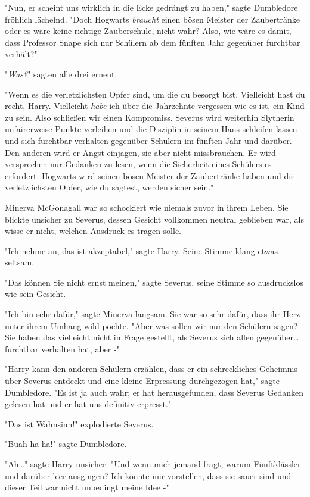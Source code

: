 {"Nun, er scheint uns wirklich in die Ecke gedrängt zu haben," sagte Dumbledore fröhlich lächelnd. "Doch Hogwarts \emph{braucht} einen bösen Meister der Zaubertränke oder es wäre keine richtige Zauberschule, nicht wahr? Also, wie wäre es damit, dass Professor Snape sich nur Schülern ab dem fünften Jahr gegenüber furchtbar verhält?"

"\emph{Was?}" sagten alle drei erneut.

"Wenn es die verletzlichsten Opfer sind, um die du besorgt bist. Vielleicht hast du recht, Harry. Vielleicht \emph{habe} ich über die Jahrzehnte vergessen wie es ist, ein Kind zu sein. Also schließen wir einen Kompromiss. Severus wird weiterhin Slytherin unfairerweise Punkte verleihen und die Disziplin in seinem Haus schleifen lassen und sich furchtbar verhalten gegenüber Schülern im fünften Jahr und darüber. Den anderen wird er Angst einjagen, sie aber nicht missbrauchen. Er wird versprechen nur Gedanken zu lesen, wenn die Sicherheit eines Schülers es erfordert. Hogwarts wird seinen bösen Meister der Zaubertränke haben und die verletzlichsten Opfer, wie du sagtest, werden sicher sein."

Minerva McGonagall war so schockiert wie niemals zuvor in ihrem Leben. Sie blickte unsicher zu Severus, dessen Gesicht vollkommen neutral geblieben war, als wisse er nicht, welchen Ausdruck es tragen solle.

"Ich nehme an, das ist akzeptabel," sagte Harry. Seine Stimme klang etwas seltsam.

"Das können Sie nicht ernst meinen," sagte Severus, seine Stimme so ausdruckslos wie sein Gesicht.

"Ich bin sehr dafür," sagte Minerva langsam. Sie war so sehr dafür, dass ihr Herz unter ihrem Umhang wild pochte. "Aber was sollen wir nur den Schülern sagen? Sie haben das vielleicht nicht in Frage gestellt, als Severus sich allen gegenüber… furchtbar verhalten hat, aber -"

"Harry kann den anderen Schülern erzählen, dass er ein schreckliches Geheimnis über Severus entdeckt und eine kleine Erpressung durchgezogen hat," sagte Dumbledore. "Es ist ja auch wahr; er hat herausgefunden, dass Severus Gedanken gelesen hat und er hat uns definitiv erpresst."

"Das ist Wahnsinn!" explodierte Severus.

"Buah ha ha!" sagte Dumbledore.

"Ah…" sagte Harry unsicher. "Und wenn mich jemand fragt, warum Fünftklässler und darüber leer ausgingen? Ich könnte mir vorstellen, dass sie sauer sind und dieser Teil war nicht unbedingt meine Idee -"

}

